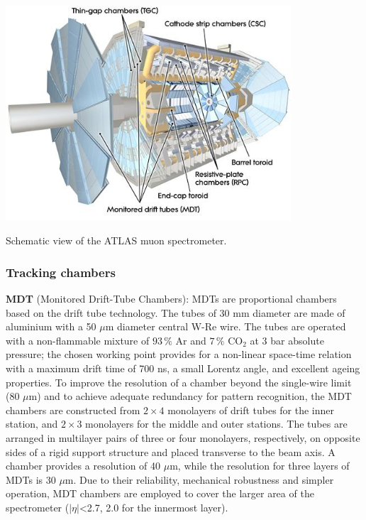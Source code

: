 \bfig[htb!]
\centering
\includegraphics[width=0.8\textwidth]{figures/Detector/muons}
\captionsetup{width=0.85\textwidth} \caption{\small Schematic view of the ATLAS muon spectrometer.}
\label{sec:det:fig:ATLASMuon}
\efig

\subsubsection{Tracking chambers}

\bi
\ib \textbf{MDT} (Monitored Drift-Tube Chambers): MDTs are proportional chambers based on the drift tube technology. The tubes of 30 mm diameter are made of aluminium with a 50 $\mu$m diameter central W-Re wire. The tubes are operated with a non-flammable mixture of $93\,\%$ Ar and $7\,\%$ CO$_{2}$ at 3 bar absolute pressure; the chosen working point provides for a non-linear space-time relation with a maximum drift time of 700 ns, a small Lorentz angle, and excellent ageing properties. To improve the resolution of a chamber beyond the single-wire limit (80 $\mu$m) and to achieve adequate redundancy for pattern recognition, the MDT chambers are constructed from $2\times4$ monolayers of drift tubes for the inner station, and $2\times3$ monolayers for the middle and outer stations. The tubes are arranged in multilayer pairs of three or four monolayers, respectively, on opposite sides of a rigid support structure and placed transverse to the beam axis. A chamber provides a resolution of 40 $\mu$m, while the resolution for three layers of MDTs is 30 $\mu$m. Due to their reliability, mechanical robustness and simpler operation, MDT chambers are employed to cover the larger area of the spectrometer ($|\eta|$<2.7, 2.0 for the innermost layer).

